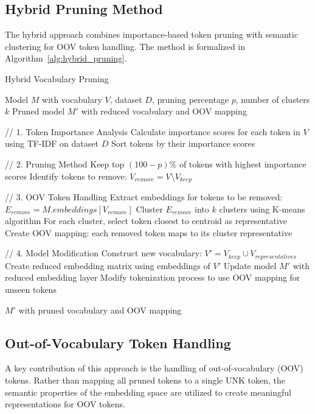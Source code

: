 \documentclass[twocolumn]{article}
\begin{document}
\subsection{Hybrid Pruning Method}
The hybrid approach combines importance-based token pruning with semantic clustering for OOV token handling. The method is formalized in Algorithm~\ref{alg:hybrid_pruning}.

\begin{algorithm}[H]
\caption{Hybrid Vocabulary Pruning}
\label{alg:hybrid_pruning}
\begin{algorithmic}[1]
\scriptsize
\Require Model $M$ with vocabulary $V$, dataset $D$, pruning percentage $p$, number of clusters $k$
\Ensure Pruned model $M'$ with reduced vocabulary and OOV mapping

\State // 1. Token Importance Analysis
\State Calculate importance scores for each token in $V$ using TF-IDF on dataset $D$
\State Sort tokens by their importance scores

\State // 2. Pruning Method
\State Keep top $(100-p)\%$ of tokens with highest importance scores
\State Identify tokens to remove: $V_{remove} = V \setminus V_{keep}$

\State // 3. OOV Token Handling
\State Extract embeddings for tokens to be removed: $E_{remove} = M.embeddings[V_{remove}]$
\State Cluster $E_{remove}$ into $k$ clusters using K-means algorithm
\State For each cluster, select token closest to centroid as representative
\State Create OOV mapping: each removed token maps to its cluster representative

\State // 4. Model Modification
\State Construct new vocabulary: $V' = V_{keep} \cup V_{representatives}$
\State Create reduced embedding matrix using embeddings of $V'$
\State Update model $M'$ with reduced embedding layer
\State Modify tokenization process to use OOV mapping for unseen tokens

\State \Return $M'$ with pruned vocabulary and OOV mapping
\end{algorithmic}
\end{algorithm}

\subsection{Out-of-Vocabulary Token Handling}
A key contribution of this approach is the handling of out-of-vocabulary (OOV) tokens. Rather than mapping all pruned tokens to a single UNK token, the semantic properties of the embedding space are utilized to create meaningful representations for OOV tokens.
\end{document}
